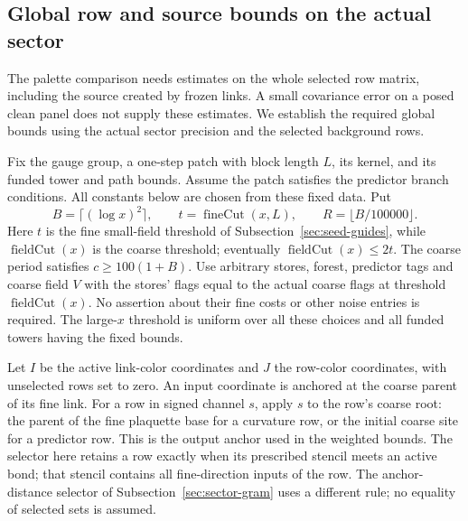 \subsection{Global row and source bounds on the actual sector}
\label{sec:actual-global-row-prices}

The palette comparison needs estimates on the whole selected row matrix,
including the source created by frozen links. A small covariance error
on a posed clean panel does not supply these estimates. We establish the
required global bounds using the actual sector precision and the selected
background rows.

Fix the gauge group, a one-step patch with block length $L$, its kernel,
and its funded tower and path bounds. Assume the patch satisfies the
predictor branch conditions. All constants below are chosen from these
fixed data. Put
\[
 B=\lceil(\log x)^2\rceil,\qquad t=\operatorname{fineCut}(x,L),
 \qquad R=\lfloor B/100000\rfloor.
\]
Here $t$ is the fine small-field threshold of
Subsection~\ref{sec:seed-guides}, while $\operatorname{fieldCut}(x)$ is the
coarse threshold; eventually $\operatorname{fieldCut}(x)\le2t$.
The coarse period satisfies $c\ge100(1+B)$. Use arbitrary stores,
forest, predictor tags and coarse field $V$ with the stores' flags equal
to the actual coarse flags at threshold $\operatorname{fieldCut}(x)$.
No assertion about their fine costs or other noise entries is required.
The large-$x$ threshold is uniform over all these choices and all funded
towers having the fixed bounds.

Let $I$ be the active link-color coordinates and $J$ the row-color
coordinates, with unselected rows set to zero. An input coordinate is
anchored at the coarse parent of its fine link. For a row in signed
channel $s$, apply $s$ to the row's coarse root: the parent of the
fine plaquette base for a curvature row, or the initial coarse site for
a predictor row. This is the output anchor used in the weighted bounds.
The selector here retains a row exactly when its prescribed stencil
meets an active bond; that stencil contains all fine-direction inputs of
the row. The anchor-distance selector of Subsection~\ref{sec:sector-gram}
uses a different rule; no equality of selected sets is assumed.

